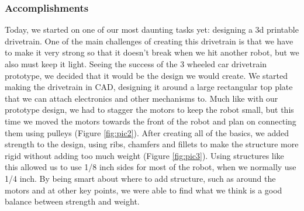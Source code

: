 \subsubsection*{Accomplishments}
Today, we started on one of our most daunting tasks yet: designing a 3d printable drivetrain. One of the main challenges of creating this drivetrain is that we have to make it very strong so that it doesn't break when we hit another robot, but we also must keep it light. Seeing the success of the 3 wheeled car drivetrain prototype, we decided that it would be the design we would create. We started making the drivetrain in CAD, designing it around a large rectangular top plate that we can attach electronics and other mechanisms to. Much like with our prototype design, we had to stagger the motors to keep the robot small, but this time we moved the motors towards the front of the robot and plan on connecting them using pulleys (Figure \ref{fig:pic2}). After creating all of the basics, we added strength to the design, using ribs, chamfers and fillets to make the structure more rigid without adding too much weight (Figure \ref{fig:pic3}). Using structures like this allowed us to use 1/8 inch sides for most of the robot, when we normally use 1/4 inch. By being smart about where to add structure, such as around the motors and at other key points, we were able to find what we think is a good balance between strength and weight.

